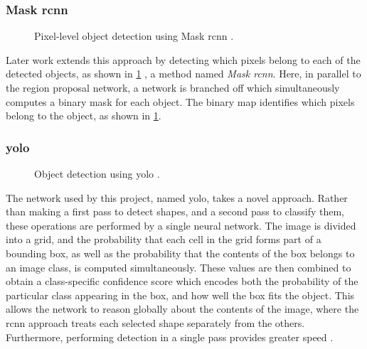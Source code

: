 \documentclass[\rootfolder/main.tex]{subfiles}
\begin{document}
\subsubsection{Mask \acrshort{rcnn}}

\begin{figure}[H]
    \caption[Pixel-level object detection using Mask \acrshort{rcnn}.]{Pixel-level object detection using Mask \acrshort{rcnn} \cite{He2017}.\label{fig:mask-rcnn}}
\end{figure}

Later work extends this approach by detecting which pixels belong to each of the detected objects, as shown in \cref{fig:mask-rcnn} \cite{He2017}, a method named \emph{Mask \acrshort{rcnn}}.
Here, in parallel to the region proposal network, a network is branched off which simultaneously computes a binary mask for each object.
The binary map identifies which pixels belong to the object, as shown in \cref{fig:mask-rcnn}.

\subsubsection{\acrfull{yolo}}

\begin{figure}[H]
    \caption[Object detection using \acrshort{yolo}.]{Object detection using \acrshort{yolo} \cite{JosephRedmon}.\label{fig:yolo}}
\end{figure}

The network used by this project, named \acrfull{yolo}, takes a novel approach.
Rather than making a first pass to detect shapes, and a second pass to classify them, these operations are performed by a single neural network.
The image is divided into a grid, and the probability that each cell in the grid forms part of a bounding box, as well as the probability that the contents of the box belongs to an image class, is computed simultaneously.
These values are then combined to obtain a class-specific confidence score which encodes both the probability of the particular class appearing in the box, and how well the box fits the object.
This allows the network to reason globally about the contents of the image, where the \acrshort{rcnn} approach treats each selected shape separately from the others.
Furthermore, performing detection in a single pass provides greater speed \cite{Redmon2015}.

\end{document}
